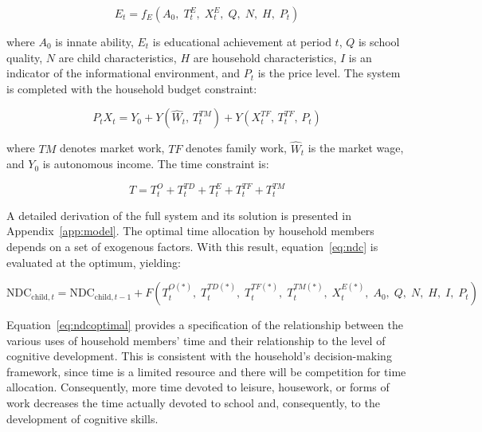 \documentclass[12pt]{article}
\newcommand{\NDC}{\mathrm{NDC}}
\newcommand{\child}{\text{child}}
\begin{document}
\begin{equation}
  E_t = f_E\!\left(A_0,\; T_t^{E},\; X_t^{E},\; Q,\; N,\; H,\; P_t\right)
  \label{eq:education}
\end{equation}

where $A_0$ is innate ability, $E_t$ is educational achievement at period $t$,
$Q$ is school quality, $N$ are child characteristics, $H$ are household
characteristics, $I$ is an indicator of the informational environment, and
$P_t$ is the price level. The system is completed with the household budget
constraint:

\begin{equation}
  P_t X_t = Y_0 + Y\!\left(\hat{W}_t,\, T_t^{TM}\right)
            + Y\!\left(X_t^{TF},\, T_t^{TF},\, P_t\right)
  \label{eq:budget}
\end{equation}

where $TM$ denotes market work, $TF$ denotes family work, $\hat{W}_t$ is the
market wage, and $Y_0$ is autonomous income. The time constraint is:

\begin{equation}
  T = T_t^{O} + T_t^{TD} + T_t^{E} + T_t^{TF} + T_t^{TM}
  \label{eq:timeconstraint}
\end{equation}

A detailed derivation of the full system and its solution is presented in
Appendix~\ref{app:model}. The optimal time allocation by household members
depends on a set of exogenous factors. With this result, equation~\eqref{eq:ndc}
is evaluated at the optimum, yielding:

\begin{equation}
  \NDC_{\child,t} = \NDC_{\child,t-1}
    + F\!\left(T_t^{O(*)},\; T_t^{TD(*)},\; T_t^{TF(*)},\; T_t^{TM(*)},\;
               X_t^{E(*)},\; A_0,\; Q,\; N,\; H,\; I,\; P_t\right)
  \label{eq:ndcoptimal}
\end{equation}

Equation~\eqref{eq:ndcoptimal} provides a specification of the relationship
between the various uses of household members' time and their relationship to
the level of cognitive development. This is consistent with the household's
decision-making framework, since time is a limited resource and there will be
competition for time allocation. Consequently, more time devoted to leisure,
housework, or forms of work decreases the time actually devoted to school and,
consequently, to the development of cognitive skills.

\end{document}
